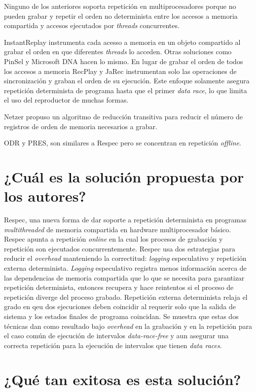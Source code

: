 Ninguno de los anteriores soporta repetición en multiprocesadores porque no pueden grabar y repetir el orden no determinista entre los accesos a memoria compartida y accesos ejecutados por \emph{threads} concurrentes.

InstantReplay instrumenta cada acesso a memoria en un objeto compartido al grabar el orden en que diferentes \emph{threads} lo acceden. Otras soluciones como PinSel y Microsoft DNA hacen lo mismo. 
En lugar de grabar el orden de todos los accesos a memoria RecPlay y JaRec instrumentan solo las operaciones de sincronización y graban el orden de su ejecución. Este enfoque solamente asegura repetición determinista de programa hasta que el primer \emph{data race}, lo que limita el uso del reproductor de muchas formas.

Netzer propuso un algoritmo de reducción transitiva para reducir el número de registros de orden de memoria necesarios a grabar. 

ODR y PRES, son similares a Respec pero se concentran en repetición \emph{offline}. 


     
\section{¿Cuál es la solución propuesta por los autores?}
Respec, una nueva forma de dar soporte a repetición determinista en programas \emph{multithreaded} de memoria compartida en hardware multiprocesador básico. Respec apunta a repetición \emph{online} en la cual los procesos de grabación y repetición son ejecutados concurrentemente. Respec usa dos estrategias para reducir el \emph{overhead} manteniendo la correctitud: \emph{logging} especulativo y repetición externa determinista. \emph{Logging} especulativo registra menos información acerca de las dependencias de memoria compartida que lo que se necesita para garantizar repetición determinista, entonces recupera y hace reintentos si el proceso de repetición diverge del proceso grabado. Repetición externa determinista relaja el grado en qeu dos ejecuciones deben coincidir al requerir solo que la salida de sistema y los estados finales de programa coincidan. Se muestra que estas dos técnicas dan como resultado bajo \emph{overhead} en la grabación y en la repetición para el caso común de ejecución de intervalos \emph{data-race-free} y aun asegurar una correcta repetición para la ejecución de intervalos que tienen \emph{data races}.

\section{¿Qué tan exitosa es esta solución?} 

